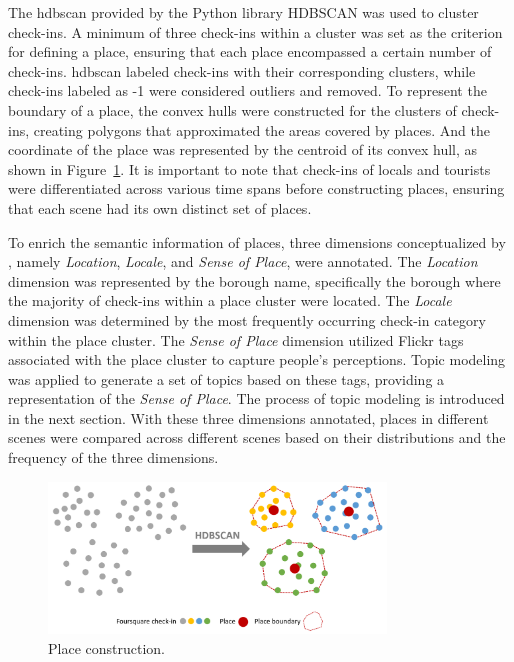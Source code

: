 \documentclass{article}
\theoremstyle{remark}
\begin{document}
The hdbscan provided by the Python library HDBSCAN \citep{mcinnes_hdbscan_2017} was used to cluster check-ins. A minimum of three check-ins within a cluster was set as the criterion for defining a place, ensuring that each place encompassed a certain number of check-ins. \acrshort{hdbscan} labeled check-ins with their corresponding clusters, while check-ins labeled as -1 were considered outliers and removed. To represent the boundary of a place, the convex hulls were constructed for the clusters of check-ins, creating polygons that approximated the areas covered by places. And the coordinate of the place was represented by the centroid of its convex hull, as shown in Figure~\ref{fig:place_construction_methodology}. It is important to note that check-ins of locals and tourists were differentiated across various time spans before constructing places, ensuring that each scene had its own distinct set of places.

To enrich the semantic information of places, three dimensions conceptualized by \cite{agnew_space_2011}, namely \textit{Location}, \textit{Locale}, and \textit{Sense of Place}, were annotated. The \textit{Location} dimension was represented by the borough name, specifically the borough where the majority of check-ins within a place cluster were located. The \textit{Locale} dimension was determined by the most frequently occurring check-in category within the place cluster. The \textit{Sense of Place} dimension utilized Flickr tags associated with the place cluster to capture people's perceptions. Topic modeling was applied to generate a set of topics based on these tags, providing a representation of the \textit{Sense of Place}. The process of topic modeling is introduced in the next section. With these three dimensions annotated, places in different scenes were compared across different scenes based on their distributions and the frequency of the three dimensions.

\begin{figure} [!h]
\centering
\includegraphics[width=0.8\textwidth]{figures/place_construction_methodology.png}
\caption{\label{fig:place_construction_methodology}Place construction.}
\end{figure}
\end{document}
